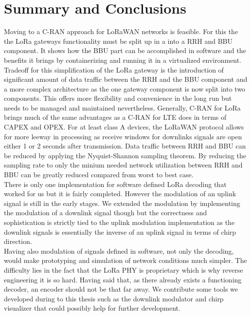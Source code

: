 \chapter{Summary and Conclusions}
Moving to a C-RAN approach for LoRaWAN networks is feasible. For this the
the LoRa gateways functionality must be split up in a into a RRH and BBU component.
It shows how the BBU part can be accomplished in software and the benefits it brings
by containerizing and running it in a virtualized environment. Tradeoff for this 
simplification of the LoRa gateway is the introduction of significant amount of data traffic between
the RRH and the BBU component and a more complex architecture as the one gateway component is now 
split into two components. This offers more flexibility and convenience in the long run but needs to 
be managed and maintained nevertheless. Generally, C-RAN for LoRa brings much of the same advantages as 
a C-RAN for LTE does in terms of CAPEX and OPEX. For at least class A devices, the LoRaWAN protocol allows for more leeway in 
processing as receive windows for downlinks signals are open either 1 or 2 seconds after transmission.
Data traffic between RRH and BBU can be reduced by applying the Nyquist-Shannon sampling theorem. 
By reducing the sampling rate to only the minium needed network utilization between RRH and BBU 
can be greatly reduced compared from worst to best case.\\
There is only one implementation for software defined LoRa decoding that worked for us but it is fairly completed.
However the modulation of an uplink signal is still in the early stages. We extended the modulation by 
implementing the modulation of a downlink signal though but the correctness and sophistication is strictly tied to 
the uplink modulation implementation as the downlink signals is essentially the inverse of an uplink signal in terms of 
chirp direction.
\\
Having also modulation of signals defined in software, not only the decoding, would make prototyping and simulation
of network conditions much simpler. The difficulty lies in the fact that the LoRa PHY is proprietary which is why reverse 
engineering it is so hard. Having said that, as there already exists a functioning decoder, an encoder should not be that far 
away. We contribute some tools we developed during to this thesis such as the downlink modulator and chirp visualizer that could
possibly help for further development. 